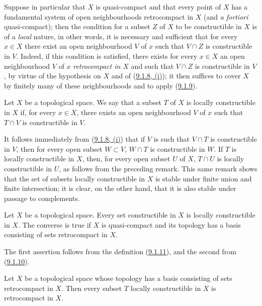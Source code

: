 \begin{env}[9.1.10]
\label{0.9.1.10}
Suppose in particular that $X$ is quasi-compact and that every point
of $X$ has a fundamental system of open neighbourhoods retrocompact
in $X$ (and \emph{a fortiori} quasi-compact); then the condition for a
subset $Z$ of $X$ to be constructible in $X$ is of a \emph{local} nature,
in other words, it is necessary and sufficient that for every $x\in X$
there exist an open neighbourhood $V$ of $x$ such that $V\cap Z$ is
constructible in $V$. Indeed, if this condition is satisfied, there
exists for every $x\in X$ an open neighbourhood $V$ of $x$ \emph{retrocompact
in $X$} and such that $V\cap Z$ is constructible in $V$, by virtue of the
hypothesis on $X$ and of (\hyperref[0.9.1.8]{9.1.8, (i)}); it then
suffices to cover $X$ by finitely many of these neighbourhoods and to apply
(\hyperref[0.9.1.9]{9.1.9}).
\end{env}

\begin{definition}[9.1.11]
\label{0.9.1.11}
Let $X$ be a topological space. We say that a subset $T$ of $X$ is
locally constructible in $X$ if, for every $x\in X$, there exists
an open neighbourhood $V$ of $x$ such that $T\cap V$ is constructible in $V$.
\end{definition}

It follows immediately from (\hyperref[0.9.1.8]{9.1.8, (i)}) that if $V$
is such that $V\cap T$ is constructible in $V$, then for every open subset
$W\subset V$, $W\cap T$ is constructible in $W$. If $T$ is locally
constructible in $X$, then, for every open subset $U$ of $X$, $T\cap U$ is
locally constructible in $U$, as follows from the preceding
remark. This same remark shows that the set of subsets locally
constructible in $X$ is stable under finite union and finite intersection;
it is clear, on the other hand, that it is also stable under passage to
complements.

\begin{proposition}[9.1.12]
\label{0.9.1.12}
Let $X$ be a topological space. Every set constructible in $X$ is
locally constructible in $X$. The converse is true if $X$ is
quasi-compact and its topology has a basis consisting of sets
retrocompact in $X$.
\end{proposition}

The first assertion follows from the definition
(\hyperref[0.9.1.11]{9.1.11}), and the second from
(\hyperref[0.9.1.10]{9.1.10}).

\begin{corollary}[9.1.13]
\label{0.9.1.13}
Let $X$ be a topological space whose topology has a basis consisting
of sets retrocompact in $X$. Then every subset $T$ locally
constructible in $X$ is retrocompact in $X$.
\end{corollary}

